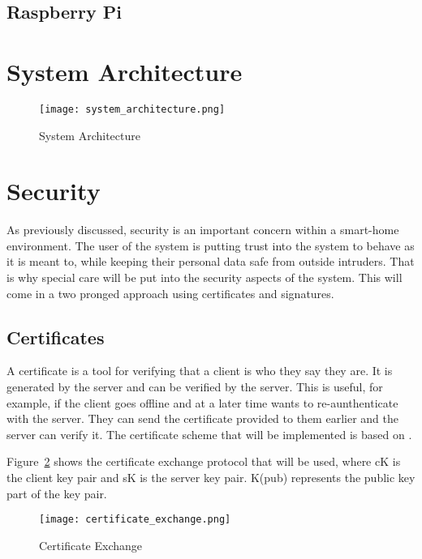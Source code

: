 \subsection{Raspberry Pi} \label{sec:chapdesign:technology:raspi}

\section{System Architecture} \label{sec:chapdesign:architecture}

\begin{figure}[h]
\caption{System Architecture}
\texttt{[image: system\_architecture.png]}
\label{fig:system_architecture}
\end{figure}

\pagebreak
\section{Security} \label{sec:chapdesign:security}
As previously discussed, security is an important concern within a smart-home environment. The user of the system is putting trust into the system to behave as it is meant to, while keeping their personal data safe from outside intruders. That is why special care will be put into the security aspects of the system. This will come in a two pronged approach using certificates and signatures. 
\subsection{Certificates}
A certificate is a tool for verifying that a client is who they say they are. It is generated by the server and can be verified by the server. This is useful, for example, if the client goes offline and at a later time wants to re-aunthenticate with the server. They can send the certificate provided to them earlier and the server can verify it. The certificate scheme that will be implemented is based on \cite{disSysConceptsDesign}.

Figure~\ref{fig:certificate_exchange} shows the certificate exchange protocol that will be used, where cK is the client key pair and sK is the server key pair. K(pub) represents the public key part of the key pair.
\begin{figure}[h]
\caption{Certificate Exchange}
\texttt{[image: certificate\_exchange.png]}
\label{fig:certificate_exchange}
\end{figure}

